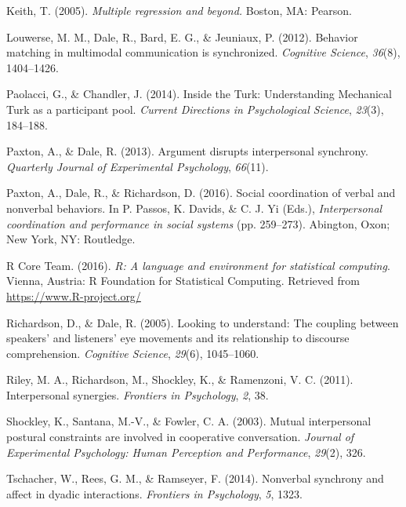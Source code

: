 \documentclass[10pt, letterpaper]{article}
\begin{document}
\hypertarget{ref-keith2005multiple}{}
Keith, T. (2005). \emph{Multiple regression and beyond.} Boston, MA:
Pearson.

\hypertarget{ref-louwerse2012behavior}{}
Louwerse, M. M., Dale, R., Bard, E. G., \& Jeuniaux, P. (2012). Behavior
matching in multimodal communication is synchronized. \emph{Cognitive
Science}, \emph{36}(8), 1404--1426.

\hypertarget{ref-paolacci2014inside}{}
Paolacci, G., \& Chandler, J. (2014). Inside the Turk: Understanding
Mechanical Turk as a participant pool. \emph{Current Directions in
Psychological Science}, \emph{23}(3), 184--188.

\hypertarget{ref-paxton2013argument}{}
Paxton, A., \& Dale, R. (2013). Argument disrupts interpersonal
synchrony. \emph{Quarterly Journal of Experimental Psychology},
\emph{66}(11).

\hypertarget{ref-paxton2016social}{}
Paxton, A., Dale, R., \& Richardson, D. (2016). Social coordination of
verbal and nonverbal behaviors. In P. Passos, K. Davids, \& C. J. Yi
(Eds.), \emph{Interpersonal coordination and performance in social
systems} (pp. 259--273). Abington, Oxon; New York, NY: Routledge.

\hypertarget{ref-r2016r}{}
R Core Team. (2016). \emph{R: A language and environment for statistical
computing}. Vienna, Austria: R Foundation for Statistical Computing.
Retrieved from \url{https://www.R-project.org/}

\hypertarget{ref-richardson2005looking}{}
Richardson, D., \& Dale, R. (2005). Looking to understand: The coupling
between speakers' and listeners' eye movements and its relationship to
discourse comprehension. \emph{Cognitive Science}, \emph{29}(6),
1045--1060.

\hypertarget{ref-riley2011interpersonal}{}
Riley, M. A., Richardson, M., Shockley, K., \& Ramenzoni, V. C. (2011).
Interpersonal synergies. \emph{Frontiers in Psychology}, \emph{2}, 38.

\hypertarget{ref-shockley2003mutual}{}
Shockley, K., Santana, M.-V., \& Fowler, C. A. (2003). Mutual
interpersonal postural constraints are involved in cooperative
conversation. \emph{Journal of Experimental Psychology: Human Perception
and Performance}, \emph{29}(2), 326.

\hypertarget{ref-tschacher2014nonverbal}{}
Tschacher, W., Rees, G. M., \& Ramseyer, F. (2014). Nonverbal synchrony
and affect in dyadic interactions. \emph{Frontiers in Psychology},
\emph{5}, 1323.
\end{document}
